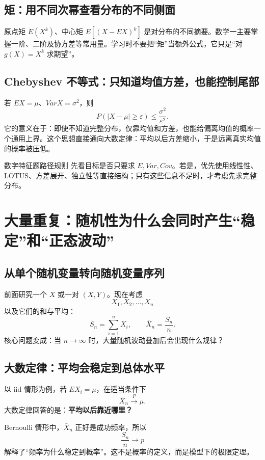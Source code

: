 \documentclass[11pt,a4paper,openany]{ctexbook}
\newcommand{\key}[1]{\textbf{\color{deep}#1}}
\begin{document}
\section{矩：用不同次幂查看分布的不同侧面}
原点矩 $E(X^k)$、中心矩 $E[(X-EX)^k]$ 是对分布的不同摘要。数学一主要掌握一阶、二阶及协方差等常用量。学习时不要把“矩”当额外公式，它只是“对 $g(X)=X^k$ 求期望”。

\section{Chebyshev 不等式：只知道均值方差，也能控制尾部}
若 $EX=\mu$、$VarX=\sigma^2$，则
\[
P(|X-\mu|\ge\varepsilon)\le\frac{\sigma^2}{\varepsilon^2}.
\]
它的意义在于：即使不知道完整分布，仅靠均值和方差，也能给偏离均值的概率一个通用上界。这个思想直接通向大数定律：平均以后方差缩小，于是远离真实均值的概率被压低。

\begin{methodbox}{数字特征题路径规则}
先看目标是否只要求 $E,Var,Cov$。若是，优先使用线性性、LOTUS、方差展开、独立性等直接结构；只有这些信息不足时，才考虑先求完整分布。
\end{methodbox}

\chapter{大量重复：随机性为什么会同时产生“稳定”和“正态波动”}

\section{从单个随机变量转向随机变量序列}
前面研究一个 $X$ 或一对 $(X,Y)$。现在考虑
\[
X_1,X_2,\dots,X_n
\]
以及它们的和与平均：
\[
S_n=\sum_{i=1}^nX_i,\qquad \bar X_n=\frac{S_n}{n}.
\]
核心问题变成：当 $n\to\infty$ 时，大量随机波动叠加后会出现什么规律？

\section{大数定律：平均会稳定到总体水平}
以 iid 情形为例，若 $EX_i=\mu$，在适当条件下
\[
\bar X_n\xrightarrow{P}\mu.
\]
大数定律回答的是：\key{平均以后靠近哪里？}

Bernoulli 情形中，$\bar X_n$ 正好是成功频率，所以
\[
\frac{S_n}{n}\to p
\]
解释了“频率为什么稳定到概率”。这不是概率的定义，而是模型下的极限定理。
\end{document}
